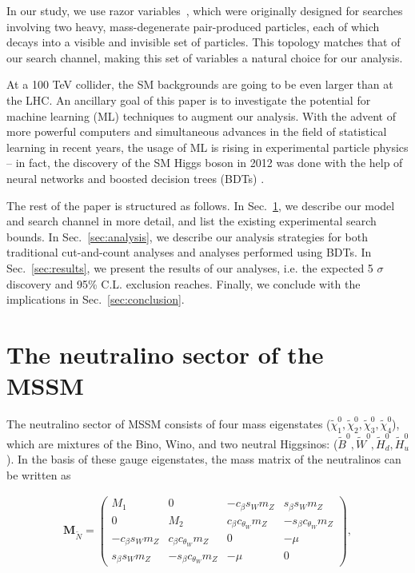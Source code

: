 \documentclass[a4paper,11pt]{article}
\renewcommand{\H}{\widetilde{H}^0}
\newcommand{\W}{\widetilde{W}^0}
\newcommand{\B}{\widetilde{B}^0}
\newcommand{\N}{\widetilde{\chi}^0}
\begin{document}
In our study, we use razor variables~\cite{Rogan:2010kb}, which were originally designed
for searches involving two heavy, mass-degenerate pair-produced
particles, each of which decays into a visible and invisible set of
particles. This topology matches that of our search channel, making this
set of variables a natural choice for our analysis.  

At a 100 TeV collider, the  SM backgrounds are going to be even larger than
at the LHC.  An ancillary goal of this paper is to investigate the
potential for machine learning (ML) techniques to augment our analysis.
With the advent of more powerful computers and simultaneous advances in
the field of statistical learning in recent years, the usage of ML is
rising in experimental particle physics -- in fact, the discovery of the
SM Higgs boson in 2012 was done with the help of neural networks
\cite{Aad:2012tfa} and boosted decision trees (BDTs)
\cite{Chatrchyan:2012xdj}.

The rest of the paper is structured as follows. In Sec.~\ref{sec:model}, we
describe our model and search channel in more detail, and list the existing
experimental search bounds. In Sec.~\ref{sec:analysis}, we describe our
analysis strategies for both traditional cut-and-count analyses and analyses
performed using BDTs. In Sec.~\ref{sec:results}, we present the results of our
analyses, i.e. the expected 5 $\sigma$ discovery and 95\% C.L. exclusion
reaches. Finally, we conclude with the implications in
Sec.~\ref{sec:conclusion}.

\section{The neutralino sector of the MSSM}
\label{sec:model}

 
The neutralino sector of MSSM consists of four mass eigenstates
($\N_1,\N_2,\N_3,\N_4$), which are mixtures of the Bino, Wino, and two neutral
Higgsinos: ($\B,\W,\H_d,\H_u$). In the basis of these gauge
eigenstates, the mass matrix of the neutralinos can be written as

\newcommand{\cb}{ c_\beta}
\newcommand{\cw}{ c_{\theta_W}}
\newcommand{\sinb}{ s_\beta}
\newcommand{\sw}{ s_W}
\newcommand{\mz}{ m_Z}

\begin{align}
  \mathbf{M}_{\widetilde{N}}=
  \begin{pmatrix}
    M_1         & 0            & -\cb\sw\mz & \sinb\sw\mz \\
    0           & M_2          & \cb\cw\mz  & -\sinb\cw\mz \\
    -\cb\sw\mz  & \cb\cw\mz    & 0          & -\mu \\
    \sinb\sw\mz & -\sinb\cw\mz & -\mu       & 0
  \end{pmatrix},
\end{align}
\end{document}
